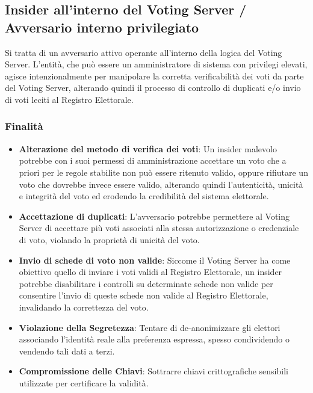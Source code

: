 \documentclass[a4paper,12pt]{article}
\begin{document}
\subsection{Insider all'interno del Voting Server / Avversario interno privilegiato}

Si tratta di un avversario attivo operante all'interno della logica del Voting Server.
L'entità, che può essere un amministratore di sistema con privilegi elevati,
agisce intenzionalmente per manipolare la corretta verificabilità dei voti da parte del Voting Server,
alterando quindi il processo di controllo di duplicati e/o invio di voti leciti al Registro Elettorale.

\subsubsection*{Finalità}

\begin{itemize}
    \item \textbf{Alterazione del metodo di verifica dei voti}: Un insider malevolo potrebbe con i suoi permessi di amministrazione accettare un voto che a priori per le regole stabilite non può essere ritenuto valido, oppure rifiutare un voto che dovrebbe invece essere valido, alterando quindi l'autenticità, unicità e integrità del voto ed erodendo la credibilità del sistema elettorale.

    \item \textbf{Accettazione di duplicati}: L'avversario potrebbe permettere al Voting Server di accettare più voti associati alla stessa autorizzazione o credenziale di voto, violando la proprietà di unicità del voto.

    \item \textbf{Invio di schede di voto non valide}: Siccome il Voting Server ha come obiettivo quello di inviare i voti validi al Registro Elettorale, un insider potrebbe disabilitare i controlli su determinate schede non valide per consentire l'invio di queste schede non valide al Registro Elettorale, invalidando la correttezza del voto.

    \item \textbf{Violazione della Segretezza}: Tentare di de-anonimizzare gli elettori associando l'identità reale alla preferenza espressa, spesso condividendo o vendendo tali dati a terzi.

    \item \textbf{Compromissione delle Chiavi}: Sottrarre chiavi crittografiche sensibili utilizzate per certificare la validità.
\end{itemize}
\end{document}
